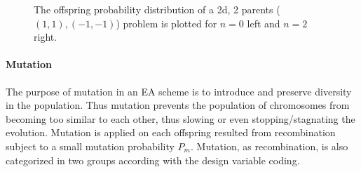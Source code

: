 \begin{itemize}
\begin{figure}[h!]
\begin{minipage}[b]{0.5\linewidth}
 \centering
\end{minipage}
\begin{minipage}[b]{0.5\linewidth}
 \centering
\end{minipage}
\caption{The offspring probability distribution of a 2d, 2 parents ($(1,1),(-1,-1)$) problem is plotted for $n=0$ left and $n=2$ right.}
\label{sbx2}
\end{figure}
\end{itemize}
  
\paragraph{Mutation}
The purpose of mutation in an EA scheme is to introduce and preserve diversity in the population. Thus mutation prevents the population of chromosomes from becoming too similar to each other, thus slowing or even stopping/stagnating the evolution. Mutation is applied on each offspring resulted from recombination subject to a small mutation probability $P_m$. Mutation, as recombination, is also categorized in two groups according with the design variable coding.     

